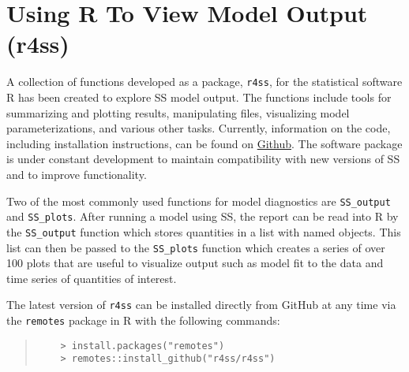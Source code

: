 
\section{Using R To View Model Output (r4ss)}\label{r4ss}

A collection of functions developed as a package, \texttt{r4ss}, for the statistical software R has been created to explore SS model output.  The functions include tools for summarizing and plotting results, manipulating files, visualizing model parameterizations, and various other tasks.  Currently, information on the code, including installation instructions, can be found on \href{https://github.com/r4ss/r4ss}{Github}.  The software package is under constant development to maintain compatibility with new versions of SS and to improve functionality.

Two of the most commonly used functions for model diagnostics are \texttt{SS\_output} and \texttt{SS\_plots}.  After running a model using SS, the report can be read into R by the \texttt{SS\_output} function which stores quantities in a list with named objects.  This list can then be passed to the \texttt{SS\_plots} function which creates a series of over 100 plots that are useful to visualize output such as model fit to the data and time series of quantities of interest.

The latest version of \texttt{r4ss} can be installed directly from GitHub at any time via the \texttt{remotes} package in R with the following commands:

\begin{quote}
	\begin{verbatim}
	> install.packages("remotes")
	> remotes::install_github("r4ss/r4ss")
	\end{verbatim}
\end{quote}




